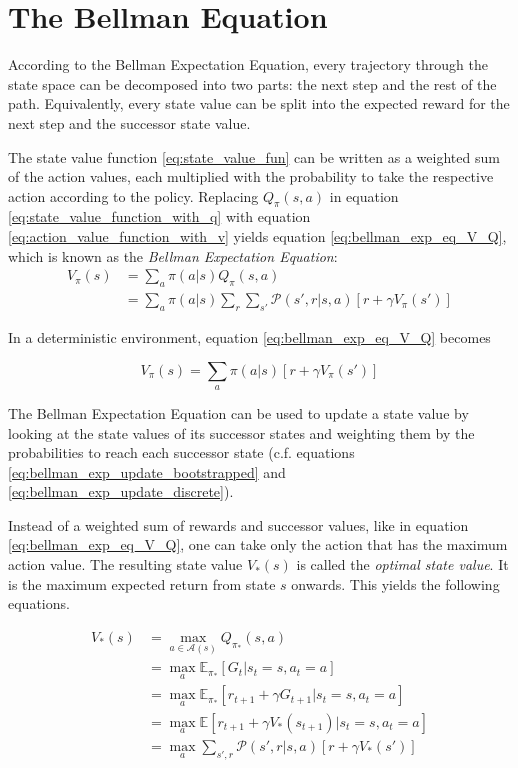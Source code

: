 \section{The Bellman Equation}

According to the Bellman Expectation Equation, every trajectory through the state space can be decomposed into two parts: the next step and the rest of the path. Equivalently, every state value can be split into the expected reward for the next step and the successor state value.

The state value function \ref{eq:state_value_fun} can be written as a weighted sum of the action values, each multiplied with the probability to take the respective action according to the policy. Replacing $Q_\pi(s,a)$ in equation \ref{eq:state_value_function_with_q} with equation \ref{eq:action_value_function_with_v} yields equation \ref{eq:bellman_exp_eq_V_Q}, which is known as the \textit{Bellman Expectation Equation}:
\begin{align}
V_\pi(s)&=\sum_a \pi(a|s)Q_\pi(s,a)\\ &= \sum_a \pi(a|s)\sum_r \sum_{s'} \mathcal{P}(s',r|s,a)[r+\gamma V_{\pi}(s')]
\label{eq:bellman_exp_eq_V_Q}
\end{align}

In a deterministic environment, equation \ref{eq:bellman_exp_eq_V_Q} becomes

\begin{equation}
V_\pi(s)= \sum_a \pi(a|s)[r+\gamma V_{\pi}(s')]
\label{eq:bellman_exp_eq_V_determinisic}
\end{equation}

The Bellman Expectation Equation can be used to update a state value by looking at the state values of its successor states and weighting them by the probabilities to reach each successor state (c.f. equations \ref{eq:bellman_exp_update_bootstrapped} and \ref{eq:bellman_exp_update_discrete}).

Instead of a weighted sum of rewards and successor values, like in equation \ref{eq:bellman_exp_eq_V_Q}, one can take only the action that has the maximum action value. The resulting state value $V_*(s)$ is called the \textit{optimal state value}. It is the maximum expected return from state $s$ onwards. This yields the following equations. 

\begin{align}
V_*(s)&=\max_{a \in \mathcal{A}(s)} Q_{\pi_*}(s,a) \label{eq:bellman_optimality_equation_v_with_q}\\
&=\max_{a}\mathbb{E}_{\pi_*}[G_t|s_t=s,a_t=a]\\
&=\max_{a}\mathbb{E}_{\pi_*}[r_{t+1} + \gamma G_{t+1}|s_t=s,a_t=a]\\
&=\max_{a}\mathbb{E}[r_{t+1} + \gamma V_*(s_{t+1})|s_t=s,a_t=a]\\
&=\max_{a}\sum_{s',r}\mathcal{P}(s',r|s,a)[r + \gamma V_*(s')]
\label{eq:bellman_optimality_equation_stochastic}
\end{align}

